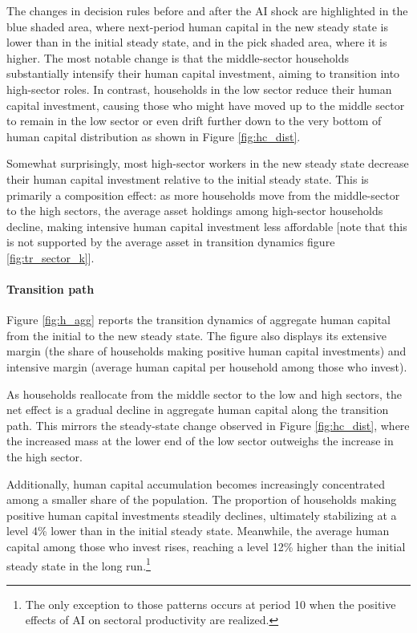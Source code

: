 \documentclass[12pt]{article}
\begin{document}
The changes in decision rules before and after the AI shock are highlighted in the blue shaded area, where next-period human capital in the new steady state is lower than in the initial steady state, and in the pick shaded area, where it is higher. The most notable change is that the middle-sector households substantially intensify their human capital investment, aiming to transition into high-sector roles. In contrast, households in the low sector reduce their human capital investment, causing those who might have moved up to the middle sector to remain in the low sector or even drift further down to the very bottom of human capital distribution as shown in Figure \ref{fig:hc_dist}. 

Somewhat surprisingly, most high-sector workers in the new steady state decrease their human capital investment relative to the initial steady state. This is primarily a composition effect: as more households move from the middle-sector to the high sectors, the average asset holdings among high-sector households decline, making intensive human capital investment less affordable {\color{red} [note that this is not supported by the average asset in transition dynamics figure \ref{fig:tr_sector_k}]}. 

\paragraph{Transition path}
Figure \ref{fig:h_agg} reports the transition dynamics of aggregate human capital from the initial to the new steady state. The figure also displays its extensive margin (the share of households making positive human capital investments) and intensive margin (average human capital per household among those who invest).

As households reallocate from the middle sector to the low and high sectors, the net effect is a gradual decline in aggregate human capital along the transition path. This mirrors the steady-state change observed in Figure \ref{fig:hc_dist}, where the increased mass at the lower end of the low sector outweighs the increase in the high sector.

Additionally, human capital accumulation becomes increasingly concentrated among a smaller share of the population. The proportion of households making positive human capital investments steadily declines, ultimately stabilizing at a level 4\% lower than in the initial steady state. Meanwhile, the average human capital among those who invest rises, reaching a level 12\% higher than the initial steady state in the long run.\footnote{The only exception to those patterns occurs at period 10 when the positive effects of AI on sectoral productivity are realized.}
\end{document}
